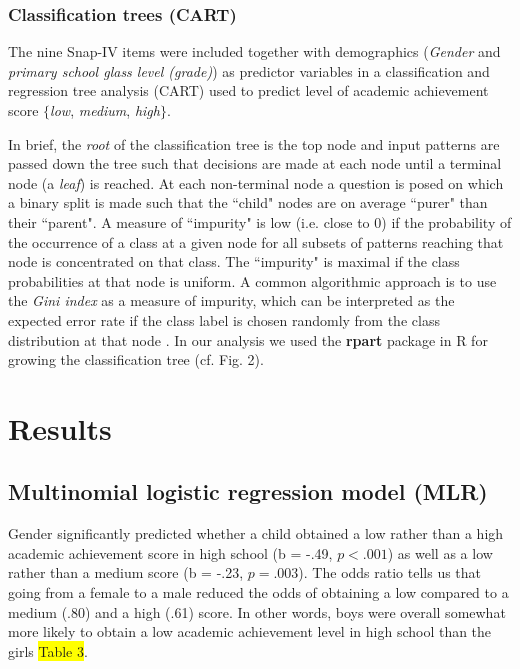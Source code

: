 \documentclass[10pt,letterpaper]{article}
\begin{document}
\vspace{3mm}

\subsubsection*{Classification trees (CART)}

The nine Snap-IV items were included together with demographics (\emph{Gender} and \emph{primary school glass level (grade)}) as predictor variables in a classification and regression tree analysis 
(CART) \cite{Breiman1984} used to predict level of academic achievement score $\{$\emph{low}, \emph{medium}, \emph{high}$\}$.

In brief, the \emph{root} of the classification tree is the top node and input patterns are passed down the tree such that decisions are made at each node until a terminal 
node (a \emph{leaf}) is reached. At each non-terminal node a question is posed on which a binary split is made such that the ``child" nodes are on average ``purer" than their ``parent". 
A measure of ``impurity" is 
low (i.e. close to $0$) if the probability of the occurrence of a class at a given node for all subsets of patterns reaching that node is concentrated on that class. 
The ``impurity" is maximal if the class probabilities at that node is uniform. 
A common algorithmic approach is to use the \emph{Gini index} as a measure of impurity,
which can be interpreted as the expected error rate if the class label is chosen randomly from the class distribution at that node \cite{Ripley1996, Strobl2009}.              
In our analysis we used the {\bf rpart} package in R for growing the classification tree (cf. Fig. 2).

\section*{Results}
\subsection*{Multinomial logistic regression model (MLR)}


Gender significantly predicted whether a child obtained a low rather than a high academic achievement score in high school (b = -.49, $p < .001$) as well as a low rather than a medium score (b = -.23, $p = .003$). The odds ratio tells us that going from a female to a male reduced the odds of obtaining a low compared to a medium (.80) and a high (.61) score.  In other words, boys were overall somewhat more likely to obtain a low academic achievement level in high school than the girls \colorbox{yellow}{Table 3}. 
\end{document}
